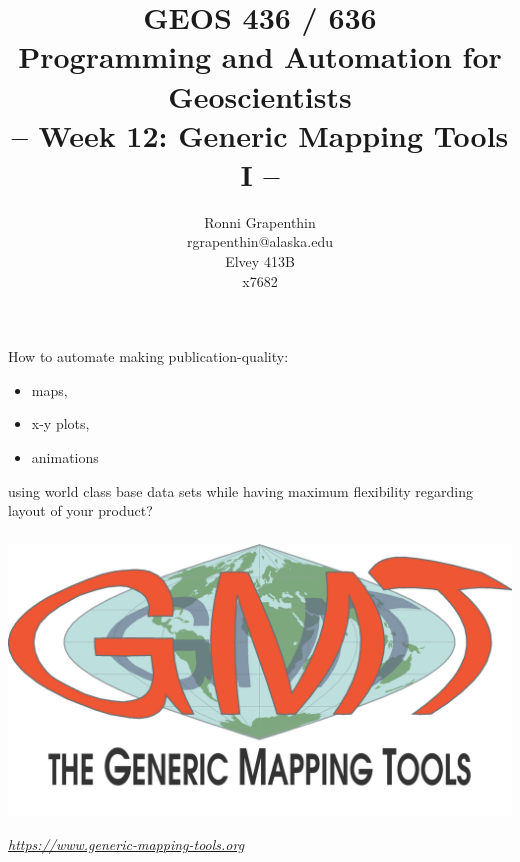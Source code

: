 \documentclass[unknownkeysallowed]{beamer}
\title[PAG]%
{GEOS 436 / 636\\
Programming and Automation for Geoscientists\\[20pt]
-- Week 12: Generic Mapping Tools I --
}
\author[Grapenthin]%
{Ronni Grapenthin\\
rgrapenthin@alaska.edu\\
Elvey 413B\\
x7682}
\institute[UAF] %
{}
\date[]{}
\begin{document}
\lstset{numbers=left, numberstyle=\tiny, stepnumber=2, basicstyle=\ttfamily, numbersep=5pt, xleftmargin=10pt}


	\begin{frame}
	\begin{center}
		\titlepage
	\end{center}
	\end{frame}


\begin{frame}
\frametitle{}
	How to automate making publication-quality:

	\begin{itemize}
		\item maps,
		\item x-y plots, 
		\item animations 
	\end{itemize}

	using world class base data sets while having maximum flexibility regarding layout of your product?
\end{frame}


\begin{frame}
\frametitle{}
	\begin{center}
		\includegraphics[width=.8\textwidth]{../figures/gmt-logo.png}	
	\end{center}
	\begin{flushright}
	\tiny{\emph{\url{https://www.generic-mapping-tools.org}}}
	\end{flushright}	
\end{frame}
\end{document}
